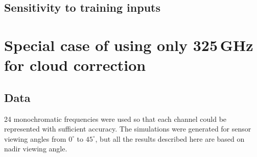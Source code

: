 \documentclass[amt, manuscript]{copernicus}
\begin{document}





\subsection{Sensitivity to training inputs}


\section{Special case of using only 325\,GHz for cloud correction}

\subsection{Data}
24 monochromatic frequencies were used so that each channel could be represented
with sufficient accuracy. The simulations were generated for sensor viewing angles from
$0^{\circ}$ to $45^{\circ}$, but all the results described here are based on nadir viewing angle.
\end{document}

